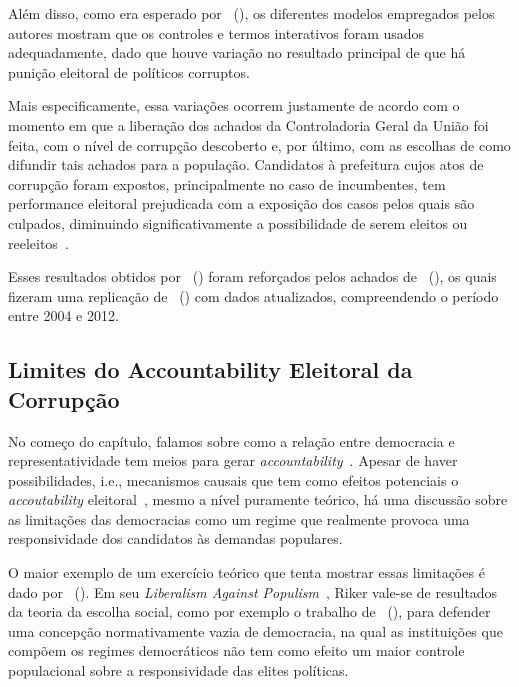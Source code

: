 \documentclass[
	12pt,				%
	openright,			%
	twoside,			%
	a4paper,			%
	openany,
	english,			%
	brazil				%
	]{abntex2}
\begin{document}
Além disso, como era esperado por ~(\citeyear{ferraz2008exposing}), os diferentes modelos empregados pelos autores mostram que os controles e termos interativos foram usados adequadamente, dado que houve variação no resultado principal de que há punição eleitoral de políticos corruptos.

Mais especificamente, essa variações ocorrem justamente de acordo com o momento em que a liberação dos achados da Controladoria Geral da União foi feita, com o nível de corrupção descoberto e, por último, com as escolhas de como difundir tais achados para a população. Candidatos à prefeitura cujos atos de corrupção foram expostos, principalmente no caso de incumbentes, tem performance eleitoral prejudicada com a exposição dos casos pelos quais são culpados, diminuindo significativamente a possibilidade de serem eleitos ou reeleitos~\cite{ferraz2008exposing}.

Esses resultados obtidos por ~(\citeyear{ferraz2008exposing}) foram reforçados pelos achados de ~(\citeyear{Avis2018Oct}), os quais fizeram uma replicação de ~(\citeyear{ferraz2008exposing}) com dados atualizados, compreendendo o período entre 2004 e 2012.

\subsection{Limites do Accountability Eleitoral da Corrupção}

No começo do capítulo, falamos sobre como a relação entre democracia e representatividade tem meios para gerar \textit{accountability}~\cite{manin1999elections}. Apesar de haver possibilidades, i.e., mecanismos causais que tem como efeitos potenciais o \textit{accoutability} eleitoral~\cite{manin1999elections}, mesmo a nível puramente teórico, há uma discussão sobre as limitações das democracias como um regime que realmente provoca uma responsividade dos candidatos às demandas populares. 

O maior exemplo de um exercício teórico que tenta mostrar essas limitações é dado por ~(\citeyear{riker1988liberalism}). Em seu \textit{Liberalism Against Populism}~\cite{riker1988liberalism}, Riker vale-se de resultados da teoria da escolha social, como por exemplo o trabalho de ~(\citeyear{arrow2012social}), para defender uma concepção normativamente vazia de democracia, na qual as instituições que compõem os regimes democráticos não tem como efeito um maior controle populacional sobre a responsividade das elites políticas.
\end{document}
